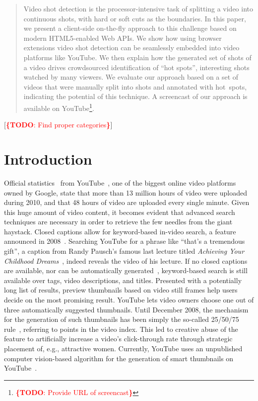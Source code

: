 \documentclass{acm_proc_article-sp}
\newcommand{\todo}[1]{\noindent\textcolor{red}{{\bf \{TODO}: #1{\bf \}}}}
\begin{document}
\begin{abstract}
Video shot detection is the processor-intensive task of splitting a video into continuous shots, with hard or soft cuts as the boundaries. In this paper, we present a client-side on-the-fly approach to this challenge based on modern HTML5-enabled Web APIs. We show how using browser extensions video shot detection can be seamlessly embedded into video platforms like YouTube.
We then explain how the generated set of shots of a video drives crowdsourced identification of ``hot spots'', interesting shots watched by many viewers. We evaluate our approach based on a set of videos that were manually split into shots and annotated with hot~spots, indicating the potential of this technique. A screencast of our approach is available on YouTube\footnote{\todo{Provide URL of screencast}}.
\end{abstract}

[\todo{Find proper categories}]

\terms{\todo{Find proper terms}}

\keywords{\todo{Find proper keywords}}

\section{Introduction}
Official statistics~\cite{youtube:stats} from YouTube~\cite{youtube}, one of the biggest online video platforms owned by Google, state that more than 13 million hours of video were uploaded during 2010, and that 48 hours of video are uploaded every single minute. Given this huge amount of video content, it becomes evident that advanced search techniques are necessary in order to retrieve the few needles from the giant haystack. Closed captions allow for keyword-based in-video search, a feature announced in 2008~\cite{googlevideo}. Searching YouTube for a phrase like ``that's a tremendous gift'', a caption from Randy Pausch's famous last lecture titled \emph{Achieving Your Childhood Dreams}~\cite{pausch}, indeed reveals the video of his lecture. If no closed captions are available, nor can be automatically generated~\cite{youtubecaptions}, keyword-based search is still available over tags, video descriptions, and titles. Presented with a potentially long list of results, preview thumbnails based on video still frames help users decide on the most promising result. YouTube lets video owners choose one out of three automatically suggested thumbnails. Until December 2008, the mechanism for the generation of such thumbnails has been simply the so-called 25/50/75 rule~\cite{youtuberule}, referring to points in the video index. This led to creative abuse of the feature to artificially increase a video's click-through rate through strategic placement of, e.g., attractive women. Currently, YouTube uses an unpublished computer vision-based algorithm for the generation of smart thumbnails on YouTube~\cite{googleresearch}.
\end{document}
